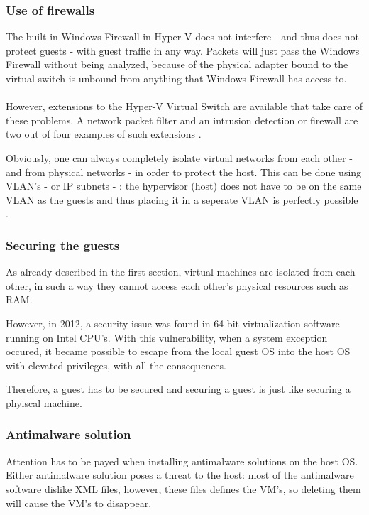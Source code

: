 \subsubsection{Use of firewalls}

The built-in Windows Firewall in Hyper-V does not interfere - and thus does not protect guests - with guest traffic in any way. Packets will just pass the Windows Firewall without being analyzed, because of the physical adapter bound to the virtual switch is unbound from anything that Windows Firewall has access to. \\ \\
However, extensions to the Hyper-V Virtual Switch are available that take care of these problems. A network packet filter and an intrusion detection or firewall are two out of four examples of such extensions \citep{Firewall1}.

Obviously, one can always completely isolate virtual networks from each other - and from physical networks - in order to protect the host. This can be done using VLAN's - or IP subnets - : the hypervisor (host) does not have to be on the same VLAN as the guests and thus placing it in a seperate VLAN is perfectly possible \citep{Firewall2}.


\subsubsection{Securing the guests}

As already described in the first section, virtual machines are isolated from each other, in such a way they cannot access each other's physical resources such as RAM.

However, in 2012, a security issue was found in 64 bit virtualization software running on Intel CPU's. With this vulnerability, when a system exception occured, it became possible to escape from the local guest OS into the host OS with elevated privileges, with all the consequences.

Therefore, a guest has to be secured and securing a guest is just like securing a phyiscal machine.

\subsubsection{Antimalware solution}

Attention has to be payed when installing antimalware solutions on the host OS. Either antimalware solution poses a threat to the host: most of the antimalware software dislike XML files, however, these files defines the VM's, so deleting them will cause the VM's to disappear.

